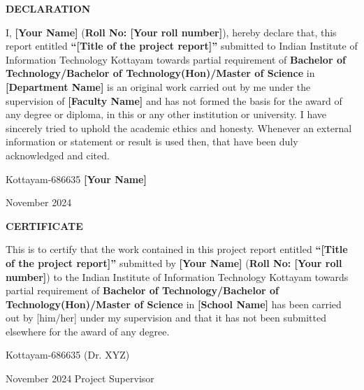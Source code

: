 \documentclass[12pt,a4wide]{report}
\theoremstyle{plain}
\theoremstyle{definition}
\theoremstyle{remark}
\begin{document}
\clearpage
 \setcounter{page}{2}
\begin{center}
{\large{\bf{DECLARATION}}}
\end{center}


\noindent I, \textbf{[Your Name]} (\textbf{Roll No: [Your roll
number]}), hereby declare that, this report entitled
\textbf{``[Title of the project report]''} submitted to Indian
Institute of Information Technology Kottayam towards partial
requirement of {\bf Bachelor of Technology/Bachelor of
Technology(Hon)/Master of Science} in \textbf{[Department  Name]}
is an original work carried out by me under the supervision of
\textbf{[Faculty Name]} and has not formed the basis for the award
of any degree or diploma, in this or any other institution or
university. I have sincerely tried to uphold the academic ethics
and honesty. Whenever an external information or statement or
result is used then, that have been duly acknowledged and cited.

\vspace{4cm}

\noindent Kottayam-686635 \hfill \textbf{[Your Name]}

\noindent November  2024

\clearpage


 \setcounter{page}{3}
\begin{center}
{\large{\bf{CERTIFICATE}}}
\end{center}


\noindent This is to certify that the work contained in this
project report entitled \textbf{``[Title of the project report]''}
submitted by \textbf{[Your Name]} (\textbf{Roll No: [Your roll
number]}) to the Indian Institute of Information Technology Kottayam
towards partial requirement of {\bf Bachelor of
Technology/Bachelor of Technology(Hon)/Master of Science} in
\textbf{[School Name]} has been carried out by [him/her] under my
supervision and that it has not been submitted elsewhere for the
award of any degree.


\vspace{4cm}

\noindent Kottayam-686635  \hfill (Dr. XYZ)

\noindent November  2024 \hfill Project Supervisor

\clearpage















\nocite{golub} \nocite{gerla}\nocite{m1}\nocite{chang}


\end{document}

